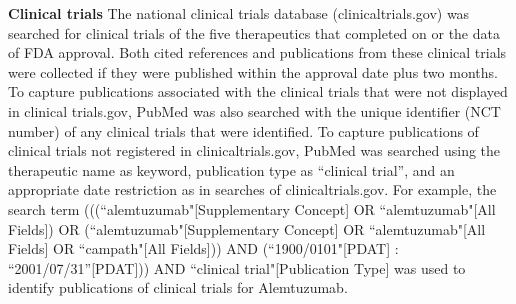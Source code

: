 \documentclass[10pt,letterpaper]{article}
\newlength\savedwidth
\newcommand\thickhline{\noalign{\global\savedwidth\arrayrulewidth\global\arrayrulewidth 2pt}%
\hline
\noalign{\global\arrayrulewidth\savedwidth}}
\begin{document}
\begin{table}[!ht]
\centering
{}
\vspace{2 mm}
\caption{
{\bf Case Studies of Five Anti-Cancer Agents} Five anti-cancer therapeutics, with FDA approval dates ranging from 2001 to 2014, were selected as case studies. The active ingredient for each of these five therapeutics is listed in column 1. While multiple patents are typically associated with a drug or biological, the single US patent number displayed represents the primary invention that preceded approval of the therapeutic. The publication date for each patent is listed in the last column.}
\label{table1}
\end{table}

\textbf{Clinical trials} The national clinical trials database (clinicaltrials.gov) was searched for clinical trials of the five therapeutics that completed on or the data of FDA approval. Both cited references and publications from these clinical trials were collected if they were published within the approval date plus two months. To capture publications associated with the clinical trials that were not displayed in clinical trials.gov, PubMed was also searched with the unique identifier (NCT number) of any clinical trials that were identified. To capture publications of clinical trials not registered in clinicaltrials.gov, PubMed was searched using the therapeutic name as keyword, publication type as ``clinical trial'', and an appropriate date restriction as in searches of clinicaltrials.gov. For example, the search term (((``alemtuzumab"[Supplementary Concept] OR ``alemtuzumab"[All Fields]) OR (``alemtuzumab"[Supplementary Concept] OR ``alemtuzumab"[All Fields] OR ``campath"[All Fields])) AND (``1900/0101"[PDAT] : ``2001/07/31''[PDAT])) AND ``clinical trial"[Publication Type] was used to identify publications of clinical trials for Alemtuzumab.
\end{document}
